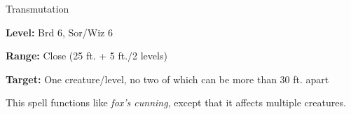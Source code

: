\label{spell:Mass Fox's Cunning}

Transmutation

\textbf{Level:} Brd 6, Sor/Wiz 6

\textbf{Range:} Close (25 ft. + 5 ft./2 levels)

\textbf{Target:} One creature/level, no two of which can be more than 30 ft. apart

This spell functions like \textit{fox's cunning}, except that it affects multiple 
creatures.

